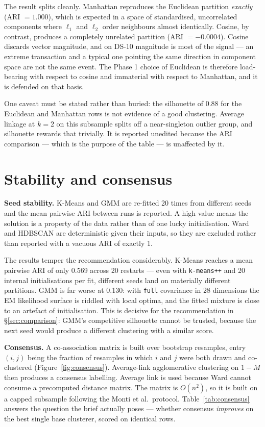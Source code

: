\documentclass[11pt, a4paper]{article}
\providecommand{\num}[1]{#1}
\begin{document}


The result splits cleanly. Manhattan reproduces the Euclidean partition
\emph{exactly} (ARI $= 1.000$), which is expected in a space of standardised,
uncorrelated components where $\ell_1$ and $\ell_2$ order neighbours almost
identically. Cosine, by contrast, produces a completely unrelated partition
(ARI $= -0.0004$). Cosine discards vector magnitude, and on DS-10 magnitude is
most of the signal --- an extreme transaction and a typical one pointing the same
direction in component space are not the same event. The Phase 1 choice of
Euclidean is therefore load-bearing with respect to cosine and immaterial with
respect to Manhattan, and it is defended on that basis.

One caveat must be stated rather than buried: the silhouette of $0.88$ for the
Euclidean and Manhattan rows is not evidence of a good clustering. Average
linkage at $k=2$ on this subsample splits off a near-singleton outlier group, and
silhouette rewards that trivially. It is reported unedited because the ARI
comparison --- which is the purpose of the table --- is unaffected by it.

\section{Stability and consensus}
\label{sec:stability}

\textbf{Seed stability.} K-Means and GMM are re-fitted 20 times from different
seeds and the mean pairwise ARI between runs is reported. A high value means the
solution is a property of the data rather than of one lucky initialisation. Ward
and HDBSCAN are deterministic given their inputs, so they are excluded rather
than reported with a vacuous ARI of exactly 1.

The results temper the recommendation considerably. K-Means reaches a mean
pairwise ARI of only \num{0.569} across 20 restarts --- even with
\texttt{k-means++} and 20 internal initialisations per fit, different seeds land
on materially different partitions. GMM is far worse at \num{0.130}: with
\texttt{full} covariance in 28 dimensions the EM likelihood surface is riddled
with local optima, and the fitted mixture is close to an artefact of
initialisation. This is decisive for the recommendation in
\S\ref{sec:comparison}: GMM's competitive silhouette cannot be trusted, because
the next seed would produce a different clustering with a similar score.

\textbf{Consensus.} A co-association matrix is built over bootstrap resamples,
entry $(i,j)$ being the fraction of resamples in which $i$ and $j$ were both
drawn and co-clustered (Figure~\ref{fig:consensus}). Average-link agglomerative
clustering on $1-M$ then produces a consensus labelling. Average link is used
because Ward cannot consume a precomputed distance matrix. The matrix is
$O(n^2)$, so it is built on a capped subsample following the Monti et al.\
protocol. Table~\ref{tab:consensus} answers the question the brief actually
poses --- whether consensus \emph{improves} on the best single base clusterer,
scored on identical rows.
\end{document}
